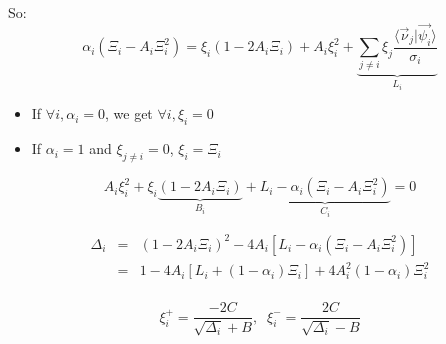 \documentclass[aps,12pt]{revtex4}
\begin{document}
So: 
\begin{equation}
	\alpha_i\left( \Xi_i - A_i \Xi_i^2 \right) = \xi_i (1-2A_i\Xi_i) + A_i \xi_i^2 +
	\underbrace{\sum_{j\not=i} \xi_j \dfrac{\langle \vec{\nu}_j \vert \vec{\psi_i} \rangle}{\sigma_i}}_{L_i}
\end{equation}

\begin{itemize}
\item If $\forall i, \alpha_i=0$, we get $\forall i, \xi_i=0$
\item If $\alpha_i=1$ and $\xi_{j\not=i}=0$, $\xi_i=\Xi_i$
\end{itemize}

\begin{equation}
A_i \xi_i^2 + \xi_i \underbrace{(1-2A_i\Xi_i)}_{B_i} + \underbrace{L_i - \alpha_i\left( \Xi_i - A_i \Xi_i^2 \right)}_{C_i} = 0
\end{equation}

\begin{equation}
\begin{array}{rcl}
	\Delta_i & = & (1-2A_i\Xi_i)^2 - 4 A_i \left[ L_i - \alpha_i\left( \Xi_i - A_i \Xi_i^2 \right)\right]\\
	  & = & 1 -4 A_i \left[L_i + (1-\alpha_i) \Xi_i\right] + 4 A_i^2 (1-\alpha_i) \Xi_i^2 \\
\end{array}
\end{equation}

\begin{equation}
	\xi_i^+ = \dfrac{-2C}{\sqrt{\Delta_i}+B}, \;\; \xi_i^- = \dfrac{2C}{\sqrt{\Delta_i}-B}
\end{equation}
\end{document}
